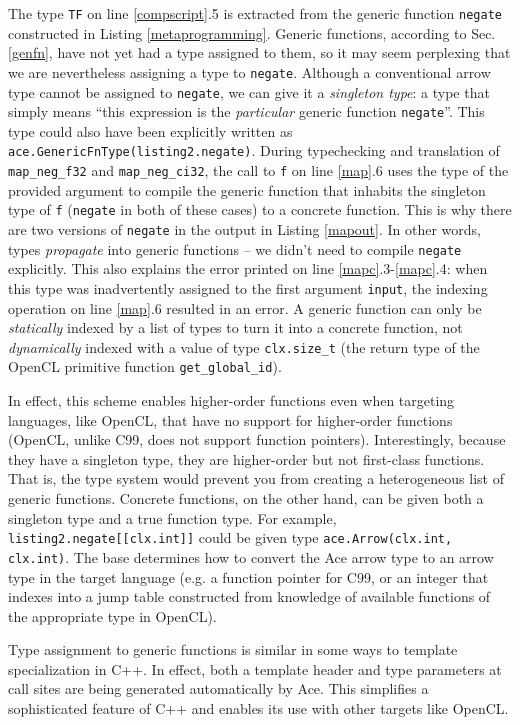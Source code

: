 \documentclass[10pt,preprint]{sigplanconf}
\begin{document}
{The type \verb|TF| on line \ref{compscript}.5 is extracted from the generic function \verb|negate| constructed in Listing \ref{metaprogramming}. Generic functions, according to Sec. \ref{genfn}, have not yet had a type assigned to them, so it may seem perplexing that we are nevertheless assigning a type to \verb|negate|. Although a conventional arrow type cannot be assigned to \verb|negate|, we can give it a \emph{singleton type}: a type that simply means ``this expression is the \emph{particular} generic function \verb|negate|''. This type could also have been explicitly written as \verb|ace.GenericFnType(listing2.negate)|. During typechecking and translation of \verb|map_neg_f32| and \verb|map_neg_ci32|, the call to \verb|f| on line \ref{map}.6 uses the type of the provided argument to compile the generic function that inhabits the singleton type of \verb|f| (\verb|negate| in both of these cases) to a concrete function. This is why there are two versions of \verb|negate| in the output in Listing \ref{mapout}. In other words, types \emph{propagate} into generic functions -- we didn't need to compile \verb|negate| explicitly. This also explains the error printed on line \ref{mapc}.3-\ref{mapc}.4: when this type was inadvertently assigned to the first argument \verb|input|, the indexing operation on line \ref{map}.6 resulted in an error. A generic function can only be \emph{statically} indexed by a list of types to turn it into a concrete function, not \emph{dynamically} indexed with a value of type \verb|clx.size_t| (the return type of the OpenCL primitive function \verb|get_global_id|).

In effect, this scheme enables higher-order functions even when targeting languages, like OpenCL, that have no support for higher-order functions (OpenCL, unlike C99, does not support function pointers). Interestingly, because they have a singleton type, they are higher-order but not first-class functions. That is, the type system would prevent you from creating a heterogeneous list of generic functions. Concrete functions, on the other hand, can be given both a singleton type and a true function type. For example, \verb|listing2.negate[[clx.int]]| could be given type \verb|ace.Arrow(clx.int, clx.int)|. The base determines how to convert the Ace arrow type to an arrow type in the target language (e.g. a function pointer for C99, or an integer that indexes into a jump table constructed from knowledge of available functions of the appropriate type in OpenCL).

Type assignment to generic functions is similar in some ways to template specialization in C++. In effect, both a template header and type parameters at call sites are being generated automatically by Ace. This simplifies a sophisticated feature of C++ and enables its use with other targets like OpenCL. %

}
\end{document}
